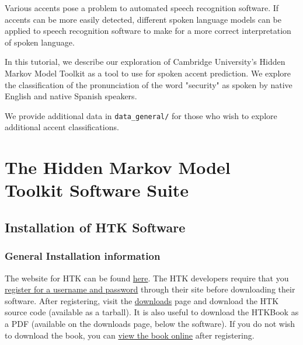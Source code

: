 \documentclass{wileySev}
\begin{document}

\subtitle{Probabilistic Accent Detection Using Hidden Markov Models}


\titlepage
\tableofcontents

\begin{introduction}
Various accents pose a problem to automated speech recognition software. If accents can be more easily detected, different spoken language models can be applied to speech recognition software to make for a more correct interpretation of spoken language.

In this tutorial, we describe our exploration of Cambridge University's Hidden Markov Model Toolkit as a tool to use for spoken accent prediction. We explore the classification of the pronunciation of the word "security" as spoken by native English and native Spanish speakers.

We provide additional data in \texttt{data\_general/} for those who wish to explore additional accent classifications.
\end{introduction}

\part[HTK Software Suite]
{The Hidden Markov Model\\Toolkit Software Suite}

\chapter{Installation of HTK Software}
\section{General Installation information}
The website for HTK can be found \href{http://htk.eng.cam.ac.uk/}{here}. The HTK developers require that you \href{http://htk.eng.cam.ac.uk/register.shtml}{register for a username and password} through their site before downloading their software. After registering, visit the \href{http://htk.eng.cam.ac.uk/download.shtml}{downloads} page and download the HTK source code (available as a tarball). It is also useful to download the HTKBook as a PDF (available on the downloads page, below the software). If you do not wish to download the book, you can \href{http://htk.eng.cam.ac.uk/docs/docs.shtml}{view the book online} after registering.
\end{document}
